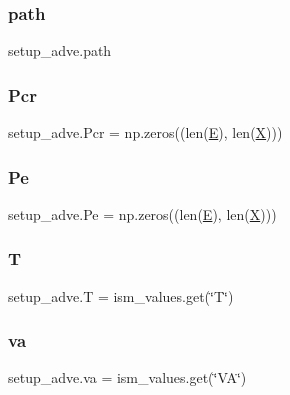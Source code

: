 \subsubsection{\texorpdfstring{path}{path}}
{\footnotesize\ttfamily setup\+\_\+adve.\+path}

\mbox{\label{namespacesetup__adve_abc561f3b00f4afc2c0a83624794e265c}} 
\subsubsection{\texorpdfstring{Pcr}{Pcr}}
{\footnotesize\ttfamily setup\+\_\+adve.\+Pcr = np.\+zeros((len(\hyperlink{namespacesetup__adve_a924af0e190ae028ed71b0d7b9dd75fed}{E}), len(\hyperlink{namespacesetup__adve_ac58005e2708a29ed334e0542dd68d336}{X})))}

\mbox{\label{namespacesetup__adve_aad148f2053f002e6876af30b7bc6528e}} 
\subsubsection{\texorpdfstring{Pe}{Pe}}
{\footnotesize\ttfamily setup\+\_\+adve.\+Pe = np.\+zeros((len(\hyperlink{namespacesetup__adve_a924af0e190ae028ed71b0d7b9dd75fed}{E}), len(\hyperlink{namespacesetup__adve_ac58005e2708a29ed334e0542dd68d336}{X})))}

\mbox{\label{namespacesetup__adve_a5e9e657724fef9828959999ef9afe02b}} 
\subsubsection{\texorpdfstring{T}{T}}
{\footnotesize\ttfamily setup\+\_\+adve.\+T = ism\+\_\+values.\+get(\char`\"{}T\char`\"{})}

\mbox{\label{namespacesetup__adve_acee144b80cdbbbfd946e2e3db6a80cfe}} 
\subsubsection{\texorpdfstring{va}{va}}
{\footnotesize\ttfamily setup\+\_\+adve.\+va = ism\+\_\+values.\+get(\char`\"{}VA\char`\"{})}

